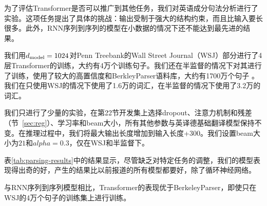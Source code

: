 为了评估Transformer是否可以推广到其他任务，我们对英语成分句法分析进行了实验。这项任务提出了具体的挑战：输出受制于强大的结构约束，而且比输入要长很多。此外，RNN序列到序列的模型在小数据的情况下还不能达到最先进的结果\cite{KVparse15}。


我们用$d_{\text{model}}=1024$对Penn Treebank的Wall Street Journal（WSJ）部分进行了4层Transformer的训练，大约有4万个训练句子。我们还在半监督的情况下对其进行了训练，使用了较大的高置信度和BerkleyParser语料库，大约有1700万个句子  \citep{KVparse15}。我们在只使用WSJ的情况下使用了1.6万的词汇，在半监督的情况下使用了3.2万的词汇。


我们只进行了少量的实验，在第22节开发集上选择dropout、注意力机制和残差（节~\ref{sec:reg}）、学习率和beam大小，所有其他参数与英译德基础翻译模型保持不变。在推理过程中，我们将最大输出长度增加到输入长度+$300$。我们设置beam大小为$21$和$alpha=0.3$，仅在WSJ和半监督下。


表\ref{tab:parsing-results}中的结果显示，尽管缺乏对特定任务的调整，我们的模型表现得出奇的好，产生的结果比以前报道的所有模型都要好，除了循环神经网络\cite{dyer-rnng:16}。



与RNN序列到序列模型\citep{KVparse15}相比，Transformer的表现优于BerkeleyParser\cite{petrov-EtAl:2006:ACL}，即使只在WSJ的4万个句子的训练集上进行训练。

